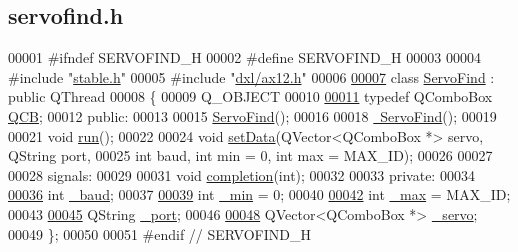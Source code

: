 \hypertarget{a00022_source}{}\subsection{servofind.\+h}

\begin{DoxyCode}
00001 \textcolor{preprocessor}{#ifndef SERVOFIND\_H}
00002 \textcolor{preprocessor}{#define SERVOFIND\_H}
00003 
00004 \textcolor{preprocessor}{#include "\hyperlink{a00025}{stable.h}"}
00005 \textcolor{preprocessor}{#include "\hyperlink{a00011}{dxl/ax12.h}"}
00006 
\hypertarget{a00022_source_l00007}{}\hyperlink{a00008}{00007} \textcolor{keyword}{class }\hyperlink{a00008}{ServoFind} : \textcolor{keyword}{public} QThread
00008 \{
00009     Q\_OBJECT
00010     
\hypertarget{a00022_source_l00011}{}\hyperlink{a00008_a8cfdbef4d4dc51f1b200a885ff827711}{00011}     \textcolor{keyword}{typedef} QComboBox \hyperlink{a00008_a8cfdbef4d4dc51f1b200a885ff827711}{QCB};
00012 \textcolor{keyword}{public}:
00013     
00015     \hyperlink{a00008_ad9b1d82aecc71025fb606b79b9bf6ce1}{ServoFind}();
00016     
00018     \hyperlink{a00008_a5f353598d5d40289c039412288e5bf73}{~ServoFind}();
00019     
00021     \textcolor{keywordtype}{void} \hyperlink{a00008_a4edb0ac2852a93f84c6aa04d5953e28d}{run}();
00022     
00024     \textcolor{keywordtype}{void} \hyperlink{a00008_a440f961980162cfd7c2ca9031b2a76e8}{setData}(QVector<QComboBox *> servo, QString port, 
00025                  \textcolor{keywordtype}{int} baud, \textcolor{keywordtype}{int} min = 0, \textcolor{keywordtype}{int} max = MAX\_ID);
00026     
00027     
00028 signals:
00029     
00031     \textcolor{keywordtype}{void} \hyperlink{a00008_a8ae9f951508e8376c3c7421df37ea619}{completion}(\textcolor{keywordtype}{int});
00032     
00033 \textcolor{keyword}{private}:
00034     
\hypertarget{a00022_source_l00036}{}\hyperlink{a00008_ad2f3b1ab924ff2051178eb981d030b66}{00036}     \textcolor{keywordtype}{int} \hyperlink{a00008_ad2f3b1ab924ff2051178eb981d030b66}{\_baud};
00037     
\hypertarget{a00022_source_l00039}{}\hyperlink{a00008_a65a3d5606c9a8bcd6ace9be36c3551e1}{00039}     \textcolor{keywordtype}{int} \hyperlink{a00008_a65a3d5606c9a8bcd6ace9be36c3551e1}{\_min} = 0;
00040     
\hypertarget{a00022_source_l00042}{}\hyperlink{a00008_abb4bcc300ab0a9c1df3c41b4e7d1fe2d}{00042}     \textcolor{keywordtype}{int} \hyperlink{a00008_abb4bcc300ab0a9c1df3c41b4e7d1fe2d}{\_max} = MAX\_ID;
00043     
\hypertarget{a00022_source_l00045}{}\hyperlink{a00008_acc6d9f94a8cf7a7a777fd9c818d98207}{00045}     QString \hyperlink{a00008_acc6d9f94a8cf7a7a777fd9c818d98207}{\_port};
00046     
\hypertarget{a00022_source_l00048}{}\hyperlink{a00008_a571ee1fc45255666e5baa0d5e9111551}{00048}     QVector<QComboBox *> \hyperlink{a00008_a571ee1fc45255666e5baa0d5e9111551}{\_servo};    
00049 \};
00050 
00051 \textcolor{preprocessor}{#endif // SERVOFIND\_H}
\end{DoxyCode}
